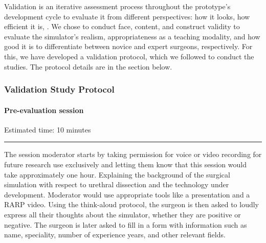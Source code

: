 

Validation is an iterative assessment process throughout the prototype's development cycle to evaluate it from different perspectives: how it looks, how efficient it is, \etc.  We chose to conduct face, content, and construct validity to evaluate the simulator's realism, appropriateness as a teaching modality, and how good it is to differentiate between novice and expert surgeons, respectively.
For this, we have developed a validation protocol, which we followed to conduct the studies. The protocol details are in the section below.

\subsubsection{Validation Study Protocol}\label{sec:protocol}


\paragraph{Pre-evaluation session}
Estimated time: 10 minutes\\[-2ex]
\hrule%
The session moderator starts by taking permission for voice or video recording for future research use exclusively and letting them know that this session would take approximately one hour. Explaining the background of the surgical simulation with respect to urethral dissection and the technology under development. Moderator would use appropriate tools like a presentation and a RARP video. Using the think-aloud protocol, the surgeon is then asked to loudly express all their thoughts about the simulator, whether they are positive or negative. The surgeon is later asked to fill in a form with information such as name, speciality, number of experience years, and other relevant fields.

